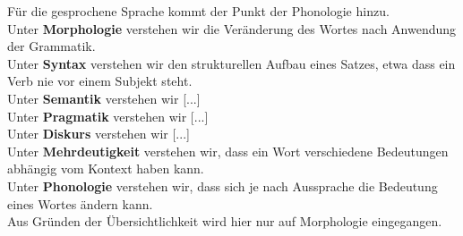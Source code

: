 \documentclass[12pt,twoside]{article}
\theoremstyle{plain}
\theoremstyle{definition}
\theoremstyle{remark}
\begin{document}
Für die gesprochene Sprache kommt der Punkt der Phonologie hinzu.\\
Unter \textbf{Morphologie} verstehen wir die Veränderung des Wortes nach Anwendung der Grammatik. \\
Unter \textbf{Syntax} verstehen wir den strukturellen Aufbau eines Satzes, etwa dass ein Verb nie vor einem Subjekt steht.\\
Unter \textbf{Semantik} verstehen wir [...]\\
Unter \textbf{Pragmatik} verstehen wir [...]\\
Unter \textbf{Diskurs} verstehen wir [...]\\
Unter \textbf{Mehrdeutigkeit} verstehen wir, dass ein Wort verschiedene Bedeutungen abhängig vom Kontext haben kann.\\
Unter \textbf{Phonologie} verstehen wir, dass sich je nach Aussprache die Bedeutung eines Wortes ändern kann.\\
Aus Gründen der Übersichtlichkeit wird hier nur auf Morphologie eingegangen.
\end{document}
